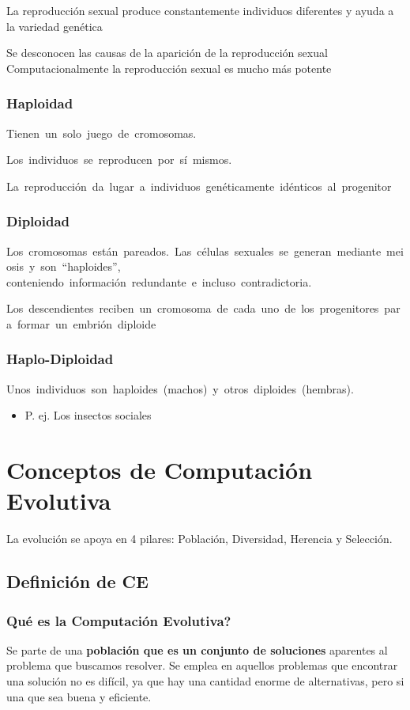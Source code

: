 \documentclass[12pt, twoside, openright]{report} %
\begin{document}
La reproducción sexual produce constantemente individuos diferentes y ayuda a la variedad genética

Se desconocen las causas de la aparición de la reproducción sexual Computacionalmente la reproducción sexual es mucho más potente

\subsubsection{Haploidad}
Tienen un solo juego de cromosomas.

Los individuos se reproducen por sí mismos.

La reproducción da lugar a individuos genéticamente idénticos al progenitor

\subsubsection{Diploidad}
Los cromosomas están pareados. Las células sexuales se generan mediante meiosis y son “haploides”, conteniendo información redundante e incluso contradictoria. 

Los descendientes reciben un cromosoma de cada uno de los progenitores para formar un embrión diploide

\subsubsection{Haplo-Diploidad}
Unos individuos son haploides (machos) y otros diploides (hembras).
\begin{itemize}
	\item P. ej. Los insectos sociales
\end{itemize}
\pagebreak

\section{Conceptos de Computación Evolutiva}
La evolución se apoya en 4 pilares: Población, Diversidad, Herencia y Selección.
\subsection{Definición de CE}
\subsubsection{Qué es la Computación Evolutiva?}
Se parte de una \textbf{población que es un conjunto de soluciones} aparentes al problema que buscamos resolver. Se emplea en aquellos problemas que encontrar una solución no es difícil, ya que hay una cantidad enorme de alternativas, pero si una que sea buena y eficiente.
\end{document}
